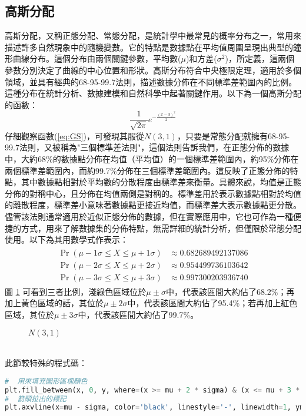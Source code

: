 \documentclass[12pt, a4paper]{article}
\begin{document}
\subsection{高斯分配}
高斯分配，又稱正態分配、常態分配，是統計學中最常見的概率分布之一，常用來描述許多自然現象中的隨機變數。它的特點是數據點在平均值周圍呈現出典型的鐘形曲線分布。這個分布由兩個關鍵參數，平均數($\mu$)和方差($\sigma^2$)，所定義，這兩個參數分別決定了曲線的中心位置和形狀。高斯分布符合中央極限定理，適用於多個領域，並具有經典的68-95-99.7法則，描述數據分佈在不同標準差範圍內的比例。這種分布在統計分析、數據建模和自然科學中起著關鍵作用。以下為一個高斯分配的函數：
\begin{equation}\label{eq:GS}
\frac{1}{\sqrt{2\pi}}e^{-\frac{(x-3)^2}{2}}
\end{equation}
仔細觀察函數(\ref{eq:GS})，可發現其服從$N(3,1)$，只要是常態分配就擁有68-95-99.7法則，又被稱為"三個標準差法則"，這個法則告訴我們，在正態分佈的數據中，大約68\%的數據點分佈在均值（平均值）的一個標準差範圍內，約95\%分佈在兩個標準差範圍內，而約99.7\%分佈在三個標準差範圍內。這反映了正態分佈的特點，其中數據點相對於平均數的分散程度由標準差來衡量。具體來說，均值是正態分佈的對稱中心，且分佈在均值兩側是對稱的。標準差用於表示數據點相對於均值的離散程度，標準差小意味著數據點更接近均值，而標準差大表示數據點更分散。儘管該法則通常適用於近似正態分佈的數據，但在實際應用中，它也可作為一種便捷的方式，用來了解數據集的分佈特點，無需詳細的統計分析，但僅限於常態分配使用。以下為其用數學式作表示：
\begin{align*}
{\displaystyle {\begin{aligned}\Pr(\mu -1\sigma \leq X\leq \mu +1\sigma )&\approx 0.682689492137086\\
\Pr(\mu -2\sigma \leq X\leq \mu +2\sigma )&\approx 0.954499736103642\\
\Pr(\mu -3\sigma \leq X\leq \mu +3\sigma )&\approx 0.997300203936740\end{aligned}}}
\end{align*}
圖 \ref{fig:GS} 可看到三者比例，淺綠色區域位於$\mu \pm \sigma$中，代表該區間大約佔了68.2\%；再加上黃色區域的話，其位於$\mu \pm 2\sigma$中，代表該區間大約佔了95.4\%；若再加上紅色區域，其位於$\mu \pm 3\sigma$中，代表該區間大約佔了99.7\%。
\begin{figure}[h]
    \caption{$N(3,1)$}
    \label{fig:GS}
\end{figure}\\
此節較特殊的程式碼：
\begin{lstlisting}[language=Python]
#  用來填充圖形區塊顏色
plt.fill_between(x, 0, y, where=(x >= mu + 2 * sigma) & (x <= mu + 3 * sigma), color='red', alpha=0.4)
#  箭頭拉出的標記
plt.axvline(x=mu - sigma, color='black', linestyle='-', linewidth=1, ymin=0.045,ymax=0.6)
\end{lstlisting}
\end{document}
